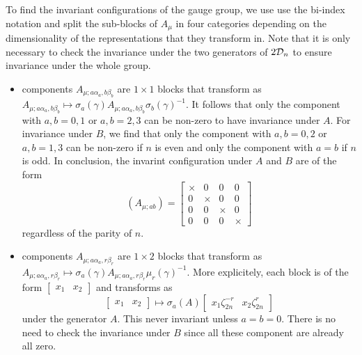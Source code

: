             To find the invariant configurations of the gauge group, we use use the bi-index notation and split the sub-blocks of $A_\mu$ in four categories depending on the dimensionality of the representations that they transform in. Note that it is only necessary to check the invariance under the two generators of $2\mathcal{D}_n$ to ensure invariance under the whole group.
            \begin{itemize}
                \item components $A_{\mu;a\alpha_a,b\beta_b}$ are $1\times 1$ blocks that transform as $A_{\mu;a\alpha_a,b\beta_b}\mapsto\sigma_a(\gamma)A_{\mu;a\alpha_a,b\beta_b}\sigma_b(\gamma)^{-1}$. It follows that only the component with $a,b=0,1$ or $a,b=2,3$ can be non-zero to have invariance under $A$. For invariance under $B$, we find that only the component with $a,b=0,2$ or $a,b=1,3$ can be non-zero if $n$ is even and only the component with $a=b$ if $n$ is odd. In conclusion, the invarint configuration under $A$ and $B$ are of the form
                \begin{equation}
                    (A_{\mu;ab})=\begin{bmatrix}
                        \times & 0 & 0 & 0 \\
                        0 & \times & 0 & 0 \\
                        0 & 0 & \times & 0 \\
                        0 & 0 & 0 & \times
                    \end{bmatrix}
                \end{equation}
                regardless of the parity of $n$.
                \item components $A_{\mu;a\alpha_a,r\beta_r}$ are $1\times 2$ blocks that transform as $A_{\mu;a\alpha_a,r\beta_r}\mapsto\sigma_a(\gamma)A_{\mu;a\alpha_a,r\beta_r}\mu_r(\gamma)^{-1}$. More explicitely, each block is of the form $\begin{bmatrix} x_1 & x_2 \end{bmatrix}$ and transforms as
                \begin{equation*}
                    \begin{bmatrix} x_1 & x_2 \end{bmatrix}\mapsto\sigma_a(A)\begin{bmatrix} x_1\zeta^{-r}_{2n} & x_2\zeta^{r}_{2n} \end{bmatrix}
                \end{equation*}
                under the generator $A$. This never invariant unless $a=b=0$. There is no need to check the invariance under $B$ since all these component are already all zero.

\end{itemize}
